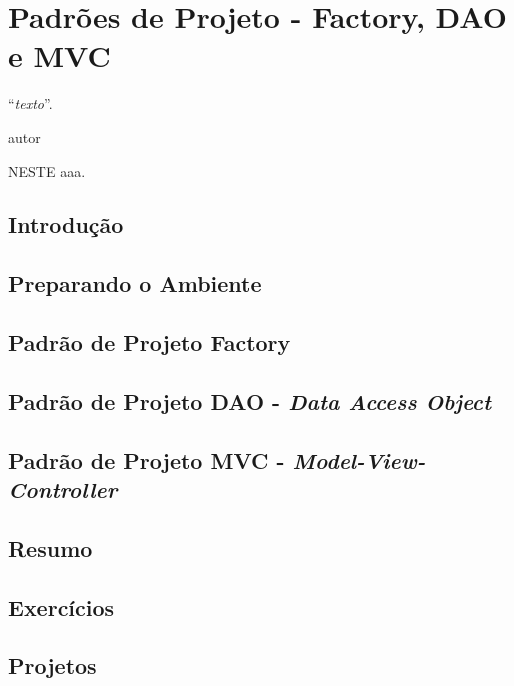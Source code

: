 \chapter{Padrões de Projeto - Factory, DAO e MVC}
\epigraph{``\textit{texto}''.}{autor}

\lettrine[lines=4, lhang=0.1, lraise=0, loversize=0.2, findent=0.1em]{\textcolor{corAzulTema}{N}}{ESTE} aaa.

\section{Introdução}

\section{Preparando o Ambiente}

\section{Padrão de Projeto Factory}

\section{Padrão de Projeto DAO - \textit{Data Access Object}}

\section{Padrão de Projeto MVC - \textit{Model-View-Controller}}

\section{Resumo}

\section{Exercícios}

\section{Projetos}